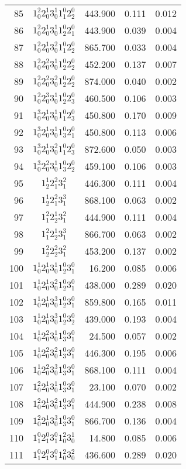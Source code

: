 \begin{table}
\begin{tabular}{rcrrr}
85&$1_0^2 2_0^1 3_0^1 1_1^0 2_2^0$& 443.900& 0.111& 0.012\\
86&$1_0^2 2_0^1 3_0^1 1_2^0 2_1^0$& 443.900& 0.039& 0.004\\
87&$1_0^2 2_0^1 3_0^2 1_1^0 2_2^0$& 865.700& 0.033& 0.004\\
88&$1_0^2 2_0^2 3_0^1 1_2^0 2_2^0$& 452.200& 0.137& 0.007\\
89&$1_0^2 2_0^2 3_0^2 1_2^0 2_2^0$& 874.000& 0.040& 0.002\\
90&$1_0^2 2_0^3 3_0^1 1_2^0 2_3^0$& 460.500& 0.106& 0.003\\
91&$1_0^3 2_0^1 3_0^1 1_1^0 2_3^0$& 450.800& 0.170& 0.009\\
92&$1_0^3 2_0^1 3_0^1 1_3^0 2_1^0$& 450.800& 0.113& 0.006\\
93&$1_0^3 2_0^1 3_0^2 1_1^0 2_3^0$& 872.600& 0.050& 0.003\\
94&$1_0^3 2_0^2 3_0^1 1_3^0 2_2^0$& 459.100& 0.106& 0.003\\
95&$1_2^1 2_1^2 3_1^2$&446.300 &0.111 &0.004\\
96&$1_2^1 2_1^2 3_1^3$&868.100 &0.063 &0.002\\
97&$1_1^2 2_2^1 3_1^2$&444.900 &0.111 &0.004\\
98&$1_1^2 2_2^1 3_1^3$&866.700 &0.063 &0.002\\
99&$1_2^2 2_2^2 3_1^2$&453.200 &0.137 &0.002\\
100&$1_0^1 2_0^1 3_0^1 1_2^0 3_1^0$& 16.200& 0.085& 0.006\\
101&$1_0^1 2_0^1 3_0^2 1_2^0 3_1^0$& 438.000& 0.289& 0.020\\
102&$1_0^1 2_0^1 3_0^3 1_2^0 3_1^0$& 859.800& 0.165& 0.011\\
103&$1_0^1 2_0^1 3_0^3 1_2^0 3_2^0$& 439.000& 0.193& 0.004\\
104&$1_0^1 2_0^2 3_0^1 1_3^0 3_1^0$& 24.500& 0.057& 0.002\\
105&$1_0^1 2_0^2 3_0^2 1_3^0 3_1^0$& 446.300& 0.195& 0.006\\
106&$1_0^1 2_0^2 3_0^3 1_3^0 3_1^0$& 868.100& 0.111& 0.004\\
107&$1_0^2 2_0^1 3_0^1 1_3^0 3_1^0$& 23.100& 0.070& 0.002\\
108&$1_0^2 2_0^1 3_0^2 1_3^0 3_1^0$& 444.900& 0.238& 0.008\\
109&$1_0^2 2_0^1 3_0^3 1_3^0 3_1^0$& 866.700& 0.136& 0.004\\
110&$1_1^0 2_1^0 3_1^0 1_0^2 3_0^1$& 14.800& 0.085& 0.006\\
111&$1_1^0 2_1^0 3_1^0 1_0^2 3_0^2$& 436.600& 0.289& 0.020\\

\end{tabular}
\end{table}

